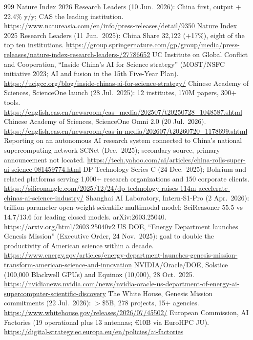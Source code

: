 \begin{thebibliography}{999}
 Nature Index 2026 Research Leaders (10 Jun.\ 2026): China first, output $+$22.4\% y/y; CAS the leading institution. \url{https://www.natureasia.com/en/info/press-releases/detail/9350}
 Nature Index 2025 Research Leaders (11 Jun.\ 2025): China Share 32,122 ($+$17\%), eight of the top ten institutions. \url{https://group.springernature.com/gp/group/media/press-releases/nature-index-research-leaders-/27786652}
 UC Institute on Global Conflict and Cooperation, ``Inside China's AI for Science strategy'' (MOST/NSFC initiative 2023; AI and fusion in the 15th Five-Year Plan). \url{https://ucigcc.org/blog/inside-chinas-ai-for-science-strategy/}
 Chinese Academy of Sciences, ScienceOne launch (28 Jul.\ 2025): 12 institutes, 170M papers, 300+ tools. \url{https://english.cas.cn/newsroom/cas_media/202507/t20250728_1048587.shtml}
 Chinese Academy of Sciences, ScienceOne Omni 2.0 (20 Jul.\ 2026). \url{https://english.cas.cn/newsroom/cas-in-media/202607/t20260720_1178699.shtml}
 Reporting on an autonomous AI research system connected to China's national supercomputing network SCNet (Dec.\ 2025); secondary source, primary announcement not located. \url{https://tech.yahoo.com/ai/articles/china-rolls-super-ai-science-081459774.html}
 DP Technology Series C (24 Dec.\ 2025); Bohrium and related platforms serving 1,000+ research organizations and 150 corporate clients. \url{https://siliconangle.com/2025/12/24/dp-technology-raises-114m-accelerate-chinas-ai-science-industry/}
 Shanghai AI Laboratory, Intern-S1-Pro (2 Apr.\ 2026): trillion-parameter open-weight scientific multimodal model; SciReasoner 55.5 vs 14.7/13.6 for leading closed models. arXiv:2603.25040. \url{https://arxiv.org/html/2603.25040v2}
 US DOE, ``Energy Department launches Genesis Mission'' (Executive Order, 24 Nov.\ 2025): goal to double the productivity of American science within a decade. \url{https://www.energy.gov/articles/energy-department-launches-genesis-mission-transform-american-science-and-innovation}
 NVIDIA/Oracle/DOE, Solstice (100,000 Blackwell GPUs) and Equinox (10,000), 28 Oct.\ 2025. \url{https://nvidianews.nvidia.com/news/nvidia-oracle-us-department-of-energy-ai-supercomputer-scientific-discovery}
 The White House, Genesis Mission commitments (22 Jul.\ 2026): $>$\$5B, 278 projects, 15+ agencies. \url{https://www.whitehouse.gov/releases/2026/07/45502/}
 European Commission, AI Factories (19 operational plus 13 antennas; €10B via EuroHPC JU). \url{https://digital-strategy.ec.europa.eu/en/policies/ai-factories}

\end{thebibliography}
